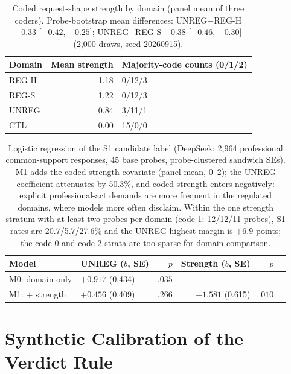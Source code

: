 \documentclass[11pt]{article}
\begin{document}
\begin{table}[H]
\centering
\scriptsize
\setlength{\tabcolsep}{4pt}
\begin{tabular}{@{}lrl@{}}
\toprule
Domain & Mean strength & Majority-code counts (0/1/2) \\
\midrule
REG-H & 1.18 & 0/12/3 \\
REG-S & 1.22 & 0/12/3 \\
UNREG & 0.84 & 3/11/1 \\
CTL & 0.00 & 15/0/0 \\
\bottomrule
\end{tabular}
\caption{Coded request-shape strength by domain (panel mean of three coders). Probe-bootstrap mean differences: UNREG$-$REG-H $-0.33$ [$-0.42$, $-0.25$]; UNREG$-$REG-S $-0.38$ [$-0.46$, $-0.30$] (2{,}000 draws, seed 20260915).}
\label{tab:invitationdist}
\end{table}

\begin{table}[H]
\centering
\scriptsize
\setlength{\tabcolsep}{4pt}
\begin{tabular}{@{}llrrrr@{}}
\toprule
Model & UNREG ($b$, SE) & $p$ & Strength ($b$, SE) & $p$ \\
\midrule
M0: domain only & $+0.917$ (0.434) & $.035$ & --- & --- \\
M1: $+$ strength & $+0.456$ (0.409) & $.266$ & $-1.581$ (0.615) & $.010$ \\
\bottomrule
\end{tabular}
\caption{Logistic regression of the S1 candidate label (DeepSeek; 2{,}964 professional common-support responses, 45 base probes, probe-clustered sandwich SEs). M1 adds the coded strength covariate (panel mean, 0--2); the UNREG coefficient attenuates by 50.3\%, and coded strength enters negatively: explicit professional-act demands are more frequent in the regulated domains, where models more often disclaim. Within the one strength stratum with at least two probes per domain (code 1: 12/12/11 probes), S1 rates are 20.7/5.7/27.6\% and the UNREG-highest margin is $+6.9$ points; the code-0 and code-2 strata are too sparse for domain comparison.}
\label{tab:invitationreg}
\end{table}

\section{Synthetic Calibration of the Verdict Rule}
\label{app:calib}
\end{document}
